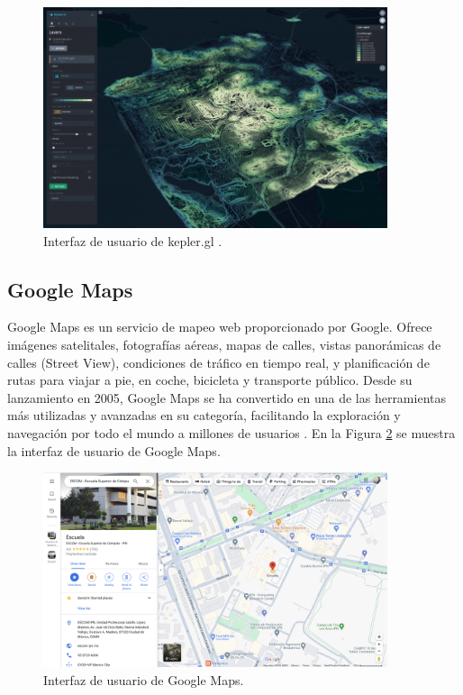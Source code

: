 \begin{figure}[!htbp]
  \centering
  \includegraphics[width=0.9\textwidth]{imagenes/02-marco-teorico/kepler-demo.png}
  \caption[Interfaz de usuario de kepler.gl]{Interfaz de usuario de kepler.gl \cite{kepler_gl_docs}.}
  \label{fig:kepler-gl}
\end{figure}

\subsection{Google Maps}
Google Maps es un servicio de mapeo web proporcionado por Google. Ofrece imágenes
satelitales, fotografías aéreas, mapas de calles, vistas panorámicas de calles
(Street View), condiciones de tráfico en tiempo real, y planificación de rutas
para viajar a pie, en coche, bicicleta y transporte público. Desde su lanzamiento
en 2005, Google Maps se ha convertido en una de las herramientas más utilizadas
y avanzadas en su categoría, facilitando la exploración y navegación por todo el
mundo a millones de usuarios \cite{google_maps_platform_start}. En la Figura
\ref{fig:google-maps-screenshot} se muestra la interfaz de usuario de Google Maps.

\begin{figure}[!htbp]
  \centering
  \includegraphics[width=0.9\textwidth]{imagenes/02-marco-teorico/google-maps-screenshot.png}
  \caption[Interfaz de usuario de Google Maps]{Interfaz de usuario de Google Maps.}
  \label{fig:google-maps-screenshot}
\end{figure}

